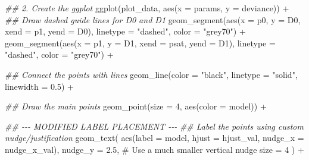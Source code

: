 \documentclass[
  letterpaper,
]{scrbook}
\newenvironment{Shaded}{\begin{snugshade}}{\end{snugshade}}
\newcommand{\AttributeTok}[1]{\textcolor[rgb]{0.40,0.45,0.13}{#1}}
\newcommand{\CommentTok}[1]{\textcolor[rgb]{0.37,0.37,0.37}{#1}}
\newcommand{\DecValTok}[1]{\textcolor[rgb]{0.68,0.00,0.00}{#1}}
\newcommand{\DocumentationTok}[1]{\textcolor[rgb]{0.37,0.37,0.37}{\textit{#1}}}
\newcommand{\FloatTok}[1]{\textcolor[rgb]{0.68,0.00,0.00}{#1}}
\newcommand{\FunctionTok}[1]{\textcolor[rgb]{0.28,0.35,0.67}{#1}}
\newcommand{\NormalTok}[1]{\textcolor[rgb]{0.00,0.23,0.31}{#1}}
\newcommand{\SpecialCharTok}[1]{\textcolor[rgb]{0.37,0.37,0.37}{#1}}
\newcommand{\StringTok}[1]{\textcolor[rgb]{0.13,0.47,0.30}{#1}}
\begin{document}
\begin{Shaded}
\begin{Highlighting}[]
\DocumentationTok{\#\# 2. Create the ggplot}
\FunctionTok{ggplot}\NormalTok{(plot\_data, }\FunctionTok{aes}\NormalTok{(}\AttributeTok{x =}\NormalTok{ params, }\AttributeTok{y =}\NormalTok{ deviance)) }\SpecialCharTok{+}
  \DocumentationTok{\#\# Draw dashed guide lines for D0 and D1}
  \FunctionTok{geom\_segment}\NormalTok{(}\FunctionTok{aes}\NormalTok{(}\AttributeTok{x =}\NormalTok{ p0, }\AttributeTok{y =}\NormalTok{ D0, }\AttributeTok{xend =}\NormalTok{ p1, }\AttributeTok{yend =}\NormalTok{ D0), }\AttributeTok{linetype =} \StringTok{"dashed"}\NormalTok{, }\AttributeTok{color =} \StringTok{"grey70"}\NormalTok{) }\SpecialCharTok{+}
  \FunctionTok{geom\_segment}\NormalTok{(}\FunctionTok{aes}\NormalTok{(}\AttributeTok{x =}\NormalTok{ p1, }\AttributeTok{y =}\NormalTok{ D1, }\AttributeTok{xend =}\NormalTok{ psat, }\AttributeTok{yend =}\NormalTok{ D1), }\AttributeTok{linetype =} \StringTok{"dashed"}\NormalTok{, }\AttributeTok{color =} \StringTok{"grey70"}\NormalTok{) }\SpecialCharTok{+}
  
  \DocumentationTok{\#\# Connect the points with lines}
  \FunctionTok{geom\_line}\NormalTok{(}\AttributeTok{color =} \StringTok{"black"}\NormalTok{, }\AttributeTok{linetype =} \StringTok{"solid"}\NormalTok{, }\AttributeTok{linewidth =} \FloatTok{0.5}\NormalTok{) }\SpecialCharTok{+}
  
  \DocumentationTok{\#\# Draw the main points}
  \FunctionTok{geom\_point}\NormalTok{(}\AttributeTok{size =} \DecValTok{4}\NormalTok{, }\FunctionTok{aes}\NormalTok{(}\AttributeTok{color =}\NormalTok{ model)) }\SpecialCharTok{+}
  
  \DocumentationTok{\#\# {-}{-}{-} MODIFIED LABEL PLACEMENT {-}{-}{-}}
  \DocumentationTok{\#\# Label the points using custom nudge/justification}
  \FunctionTok{geom\_text}\NormalTok{(}
    \FunctionTok{aes}\NormalTok{(}\AttributeTok{label =}\NormalTok{ model, }\AttributeTok{hjust =}\NormalTok{ hjust\_val, }\AttributeTok{nudge\_x =}\NormalTok{ nudge\_x\_val), }
    \AttributeTok{nudge\_y =} \FloatTok{2.5}\NormalTok{,  }\CommentTok{\# Use a much smaller vertical nudge}
    \AttributeTok{size =} \DecValTok{4}
\NormalTok{  ) }\SpecialCharTok{+}
  

\end{Highlighting}
\end{Shaded}
\end{document}

